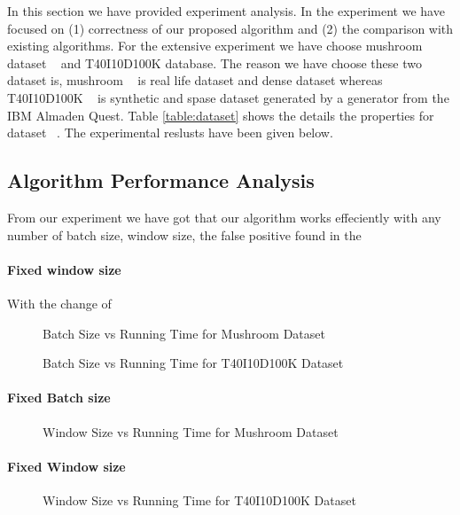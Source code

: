 In this section we have provided experiment analysis. In the experiment we have focused on (1) correctness of our proposed algorithm and (2) the comparison with existing algorithms. For the extensive experiment we have choose mushroom dataset ~\cite{dataset} and T40I10D100K database. The reason we have choose these two dataset is, mushroom ~\cite{dataset} is real life dataset and dense dataset whereas T40I10D100K ~\cite{dataset} is synthetic and spase dataset generated by a generator from the IBM Almaden Quest. Table \ref{table:dataset} shows the details the properties for dataset ~\cite{dataset}. The experimental reslusts have been given below.
\subsection{Algorithm Performance Analysis}
	From our experiment we have got that our algorithm works effeciently with any number of batch size, window size, the false positive found in the 
		\paragraph{Fixed window size}
		With the change of 
		
		\begin{figure}[h]
		\centering
			
		\caption{Batch Size vs Running Time for Mushroom Dataset ~\cite{dataset}}
		\label{result:g_m_const_batch}
		\end{figure}
		\begin{figure}[h]
		\centering
			
		\caption{Batch Size vs Running Time for T40I10D100K Dataset ~\cite{dataset}}
		\label{result:g_t10_const_batch}
		\end{figure}
		
		\paragraph{Fixed Batch size}
		\begin{figure}[h]
		\centering
			
		\caption{Window Size vs Running Time for Mushroom Dataset ~\cite{dataset}}
		\label{result:g_m_const_win}
		\end{figure}
		\paragraph{Fixed Window size}
		\begin{figure}[h]
		\centering
			
		\caption{Window Size vs Running Time for T40I10D100K Dataset ~\cite{dataset}}
		\label{result:g_t10_const_win}
		\end{figure}
		
